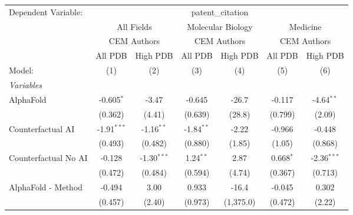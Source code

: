 \begingroup
\centering
\begin{tabular}{lcccccc}
   \tabularnewline \midrule \midrule
   Dependent Variable: & \multicolumn{6}{c}{patent\_citation}\\
 & \multicolumn{2}{c}{All Fields} & \multicolumn{2}{c}{Molecular Biology} & \multicolumn{2}{c}{Medicine} \\
\cmidrule(lr){2-3} \cmidrule(lr){4-5} \cmidrule(lr){6-7}
 & \multicolumn{2}{c}{CEM Authors} & \multicolumn{2}{c}{CEM Authors} & \multicolumn{2}{c}{CEM Authors} \\
\cmidrule(lr){2-3} \cmidrule(lr){4-5} \cmidrule(lr){6-7}
 & \multicolumn{1}{c}{All PDB} & \multicolumn{1}{c}{High PDB} & \multicolumn{1}{c}{All PDB} & \multicolumn{1}{c}{High PDB} & \multicolumn{1}{c}{All PDB} & \multicolumn{1}{c}{High PDB} \\
\cmidrule(lr){2-2} \cmidrule(lr){3-3} \cmidrule(lr){4-4} \cmidrule(lr){5-5} \cmidrule(lr){6-6} \cmidrule(lr){7-7}
   Model:                                                     & (1)           & (2)           & (3)           & (4)       & (5)           & (6)\\  
   \midrule
   \emph{Variables}\\
   AlphaFold                                                  & -0.605$^{*}$  & -3.47         & -0.645        & -26.7     & -0.117        & -4.64$^{**}$\\   
                                                              & (0.362)       & (4.41)        & (0.639)       & (28.8)    & (0.799)       & (2.09)\\   
   Counterfactual AI                                          & -1.91$^{***}$ & -1.16$^{**}$  & -1.84$^{**}$  & -2.22     & -0.966        & -0.448\\   
                                                              & (0.493)       & (0.482)       & (0.880)       & (1.85)    & (1.05)        & (0.868)\\   
   Counterfactual No AI                                       & -0.128        & -1.30$^{***}$ & 1.24$^{**}$   & 2.87      & 0.668$^{*}$   & -2.36$^{***}$\\   
                                                              & (0.472)       & (0.484)       & (0.594)       & (4.74)    & (0.367)       & (0.713)\\   
   AlphaFold - Method                                         & -0.494        & 3.00          & 0.933         & -16.4     & -0.045        & 0.302\\   
                                                              & (0.457)       & (2.40)        & (0.973)       & (1,375.0) & (0.472)       & (2.22)\\   

\end{tabular}
